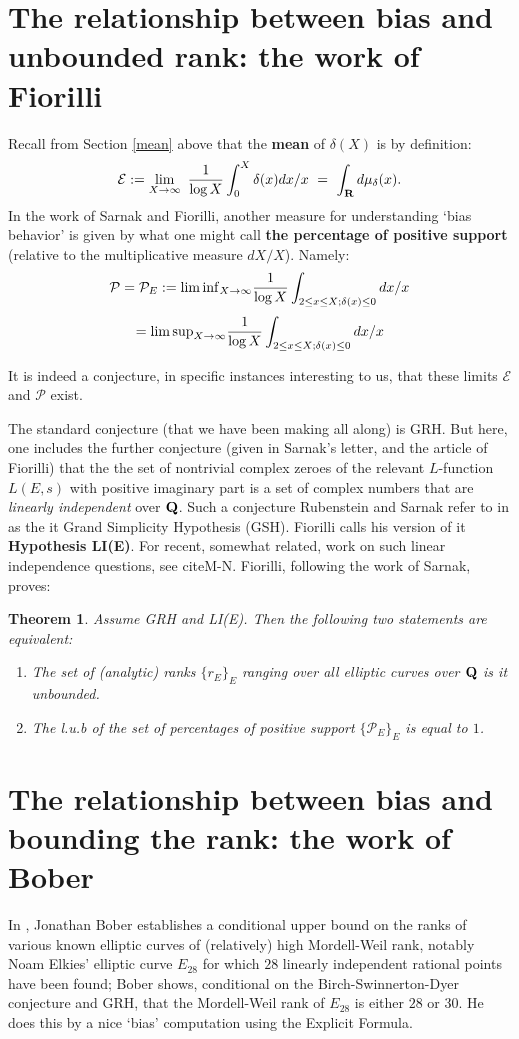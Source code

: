 \documentclass[11pt]{article}
\theoremstyle{plain}
\newtheorem{theorem}{Theorem}[section]
\theoremstyle{definition}
\numberwithin{equation}{section}
\numberwithin{figure}{section}
\numberwithin{table}{section}
\def\Q{\bf{Q}}
\begin{document}
\vskip10pt
\section{The relationship between bias and unbounded rank: the work of Fiorilli}\label{Fi}

  Recall from Section {\ref{mean}} above that the {\bf mean} of $\delta(X)$ is by definition:
$${\mathcal E} : = \lim_{X \to {\infty}}\ {\frac{1}{\log X}}\int_0^X\delta(x)dx/x \ = \ \int_{\bf R}d\mu_\delta(x).$$
In the work of Sarnak and Fiorilli, another measure for understanding `bias behavior' is given by what one might call {\bf the percentage of positive  support} (relative to the multiplicative measure $dX/X$). Namely:
$${\mathcal P} ={\mathcal P}_E:=  \lim {\rm inf}_{X\to \infty}{\frac{1}{\log X}}\int_{2\le x \le X; \delta(x)\le 0}dx/x$$
$$=   \lim {\rm sup}_{X\to \infty}{\frac{1}{\log X}}\int_{2\le x \le X; \delta(x)\le 0}dx/x$$
 \vskip20pt

  It is indeed a conjecture, in specific instances interesting to us, that these limits ${\mathcal E} $ and ${\mathcal P}$  exist.
   \vskip20pt

   The standard conjecture (that we have been making all along) is GRH. But here, one includes the further conjecture (given in Sarnak's letter, and the article of Fiorilli) that the the set of nontrivial complex zeroes of the relevant $L$-function $L(E,s)$ with positive imaginary part  is a set of complex numbers that are {\it linearly independent} over ${\Q}$. Such a conjecture Rubenstein and Sarnak refer to in \cite{R-S} as the {it Grand Simplicity Hypothesis} (GSH).  Fiorilli calls his version of it  {\bf Hypothesis LI(E)}.  For recent, somewhat related, work on such linear independence questions, see cite{M-N}.  Fiorilli, following the work of Sarnak,  proves:

   \begin{theorem} Assume GRH and LI(E). Then the following two statements are equivalent:
   \begin{enumerate} \item  The set of (analytic) ranks $\{r_E\}_E$ ranging over all elliptic curves over ${\Q}$ is {it unbounded}.
   \item  The  l.u.b of the set of  {\it percentages of positive support}  $\{{\mathcal P}_E\}_E$ is equal to $1$.\end{enumerate}\end{theorem}
\section{The relationship between bias and bounding the rank: the work of Bober}  In \cite{B}, Jonathan Bober  establishes a conditional upper bound on the ranks of various known elliptic curves of (relatively) high Mordell-Weil rank, notably Noam Elkies'  elliptic curve $E_{28}$ for which $28$ linearly independent rational points have been found; Bober shows, conditional on the Birch-Swinnerton-Dyer conjecture and GRH, that the Mordell-Weil rank of $E_{28}$ is either $28$ or $30$. He does this by a nice `bias' computation using the Explicit Formula.
\end{document}
